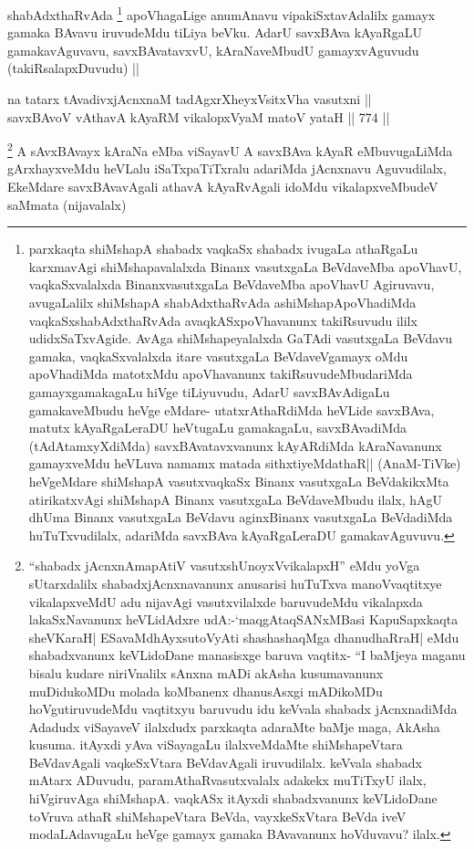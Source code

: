 \begin{artha}
shabAdxthaRvAda \footnote{parxkaqta shiMshapA shabadx vaqkaSx shabadx ivugaLa athaRgaLu karxmavAgi shiMshapavalalxda Binanx vasutxgaLa BeVdaveMba apoVhavU, vaqkaSxvalalxda BinanxvasutxgaLa BeVdaveMba apoVhavU Agiruvavu, avugaLalilx shiMshapA shabAdxthaRvAda ashiMshapApoVhadiMda vaqkaSxshabAdxthaRvAda avaqkASxpoVhavanunx takiRsuvudu ililx udidxSaTxvAgide. AvAga shiMshapeyalalxda GaTAdi vasutxgaLa BeVdavu gamaka, vaqkaSxvalalxda itare vasutxgaLa BeVdaveVgamayx oMdu apoVhadiMda matotxMdu apoVhavanunx takiRsuvudeMbudariMda gamayxgamakagaLu hiVge tiLiyuvudu, AdarU savxBAvAdigaLu gamakaveMbudu heVge eMdare- utatxrAthaRdiMda heVLide savxBAva, matutx kAyaRgaLeraDU heVtugaLu gamakagaLu, savxBAvadiMda (tAdAtamxyXdiMda) savxBAvatavxvanunx kAyARdiMda kAraNavanunx gamayxveMdu heVLuva namamx matada sithxtiyeMdathaR|| (AnaM-TiVke) heVgeMdare shiMshapA vasutxvaqkaSx Binanx vasutxgaLa BeVdakikxMta atirikatxvAgi shiMshapA Binanx vasutxgaLa BeVdaveMbudu ilalx, hAgU dhUma Binanx vasutxgaLa BeVdavu aginxBinanx vasutxgaLa BeVdadiMda huTuTxvudilalx, adariMda savxBAva kAyaRgaLeraDU gamakavAguvuvu.} apoVhagaLige anumAnavu vipakiSxtavAdalilx gamayx gamaka BAvavu iruvudeMdu tiLiya beVku. AdarU savxBAva kAyaRgaLU gamakavAguvavu, savxBAvatavxvU, kAraNaveMbudU gamayxvAguvudu (takiRsalapxDuvudu) || 
\end{artha}

\begin{shl}
na tatarx tAvadivxjAcnxnaM tadAgxrXheyxV\s sitxVha vasutxni ||  \\
savxBAvoV vA\s thavA kAyaRM vikalopxV\s yaM matoV yataH ||  774 ||  
\end{shl}

\begin{artha}
\footnote{``shabadx jAcnxnAmapAtiV vasutxshUnoyxVvikalapxH'' eMdu yoVga sUtarxdalilx shabadxjAcnxnavanunx anusarisi huTuTxva manoVvaqtitxye vikalapxveMdU adu nijavAgi vasutxvilalxde baruvudeMdu vikalapxda lakaSxNavanunx heVLidAdxre udA:-`maqgAtaqSANxMBasi KapuSapxkaqta sheVKaraH| ESavaMdhAyxsutoVyAti shashashaqMga dhanudhaRraH| eMdu shabadxvanunx keVLidoDane manasisxge baruva vaqtitx- ``I baMjeya maganu bisalu kudare niriVnalilx sAnxna mADi akAsha kusumavanunx muDidukoMDu molada koMbanenx dhanusAsxgi mADikoMDu hoVgutiruvudeMdu vaqtitxyu baruvudu idu keVvala shabadx jAcnxnadiMda Adadudx viSayaveV ilalxdudx
parxkaqta adaraMte baMje maga, AkAsha kusuma. itAyxdi yAva viSayagaLu ilalxveMdaMte shiMshapeVtara BeVdavAgali vaqkeSxVtara BeVdavAgali iruvudilalx. keVvala shabadx mAtarx ADuvudu, paramAthaRvasutxvalalx adakekx muTiTxyU ilalx, hiVgiruvAga shiMshapA. vaqkASx itAyxdi shabadxvanunx keVLidoDane toVruva athaR shiMshapeVtara BeVda, vayxkeSxVtara BeVda iveV modaLAdavugaLu heVge gamayx gamaka BAvavanunx hoVduvavu? ilalx.}
A sAvxBAvayx kAraNa eMba viSayavU A savxBAva kAyaR eMbuvugaLiMda gArxhayxveMdu heVLalu iSaTxpaTiTxralu adariMda jAcnxnavu Aguvudilalx, EkeMdare savxBAvavAgali athavA kAyaRvAgali idoMdu vikalapxveMbudeV saMmata (nijavalalx)
\end{artha}

